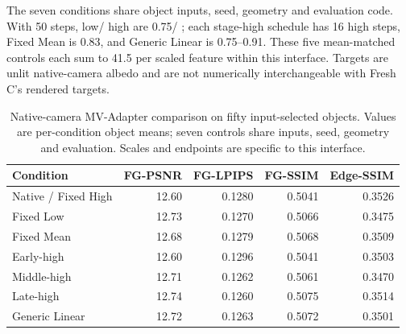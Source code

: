 \documentclass[times,twocolumn,final]{elsarticle}
\providecommand{\DIFadd}[1]{{\protect\color{blue} \sf #1}} %
\providecommand{\DIFaddbegin}{} %
\providecommand{\DIFaddend}{} %
\providecommand{\DIFaddFL}[1]{\DIFadd{#1}} %
\providecommand{\DIFaddbeginFL}{\DIFaddbegin} %
\providecommand{\DIFaddendFL}{\DIFaddend} %
\renewcommand{\DIFaddbeginFL}{}
\renewcommand{\DIFaddendFL}{}
\renewcommand{\DIFaddFL}[1]{#1}
\begin{document}
\DIFadd{The seven conditions share object inputs, seed, geometry and evaluation code. With 50 steps, low}\DIFaddend /  \DIFaddbegin \DIFadd{high are 0.75}\DIFaddend /  \DIFaddbegin \DIFadd{1.0; each stage-high schedule has 16 high steps, Fixed Mean is 0.83, and Generic Linear is 0.75--0.91. These five mean-matched controls each sum to 41.5 per scaled feature within this interface. Targets are unlit native-camera albedo and are not numerically interchangeable with Fresh C's rendered targets}\DIFaddend .

  \DIFaddbeginFL \begin{table}[ht]
\DIFaddendFL \centering
  \DIFaddbeginFL \scriptsize
\caption{Native-camera MV-Adapter comparison on fifty input-selected objects. Values are per-condition object means; seven controls share inputs, seed, geometry and evaluation. Scales and endpoints are specific to this interface.}
\label{tab:new-mva}
\begin{tabular}{lrrrr}
\DIFaddendFL \toprule
  \DIFaddbeginFL \DIFaddFL{Condition }\DIFaddendFL &   \DIFaddbeginFL \DIFaddFL{FG-PSNR }\DIFaddendFL &   \DIFaddbeginFL \DIFaddFL{FG-LPIPS }\DIFaddendFL &   \DIFaddbeginFL \DIFaddFL{FG-SSIM }\DIFaddendFL &   \DIFaddbeginFL \DIFaddFL{Edge-SSIM }\DIFaddendFL \\
\midrule
  \DIFaddbeginFL \DIFaddFL{Native / Fixed High }\DIFaddendFL &   \DIFaddbeginFL \DIFaddFL{12.60 }\DIFaddendFL &   \DIFaddbeginFL \DIFaddFL{0.1280 }\DIFaddendFL &   \DIFaddbeginFL \DIFaddFL{0.5041 }\DIFaddendFL &   \DIFaddbeginFL \DIFaddFL{0.3526 }\DIFaddendFL \\
  \DIFaddbeginFL \DIFaddFL{Fixed Low }\DIFaddendFL &   \DIFaddbeginFL \DIFaddFL{12.73 }\DIFaddendFL &   \DIFaddbeginFL \DIFaddFL{0.1270 }\DIFaddendFL &   \DIFaddbeginFL \DIFaddFL{0.5066 }\DIFaddendFL &   \DIFaddbeginFL \DIFaddFL{0.3475 }\DIFaddendFL \\
  \DIFaddbeginFL \DIFaddFL{Fixed Mean }\DIFaddendFL &   \DIFaddbeginFL \DIFaddFL{12.68 }\DIFaddendFL &   \DIFaddbeginFL \DIFaddFL{0.1279 }\DIFaddendFL &   \DIFaddbeginFL \DIFaddFL{0.5068 }\DIFaddendFL &   \DIFaddbeginFL \DIFaddFL{0.3509 }\DIFaddendFL \\
  \DIFaddbeginFL \DIFaddFL{Early-high }\DIFaddendFL &   \DIFaddbeginFL \DIFaddFL{12.60 }\DIFaddendFL &   \DIFaddbeginFL \DIFaddFL{0.1296 }\DIFaddendFL &   \DIFaddbeginFL \DIFaddFL{0.5041 }\DIFaddendFL &   \DIFaddbeginFL \DIFaddFL{0.3503 }\DIFaddendFL \\
  \DIFaddbeginFL \DIFaddFL{Middle-high }\DIFaddendFL &   \DIFaddbeginFL \DIFaddFL{12.71 }\DIFaddendFL &   \DIFaddbeginFL \DIFaddFL{0.1262 }\DIFaddendFL &   \DIFaddbeginFL \DIFaddFL{0.5061 }\DIFaddendFL &   \DIFaddbeginFL \DIFaddFL{0.3470 }\\
\DIFaddFL{Late-high }& \DIFaddFL{12.74 }& \DIFaddFL{0.1260 }& \DIFaddFL{0.5075 }& \DIFaddFL{0.3514 }\\
\DIFaddFL{Generic Linear }& \DIFaddFL{12.72 }& \DIFaddFL{0.1263 }& \DIFaddFL{0.5072 }& \DIFaddFL{0.3501 }\DIFaddendFL \\
\bottomrule
\end{tabular}
\end{table}
\end{document}
